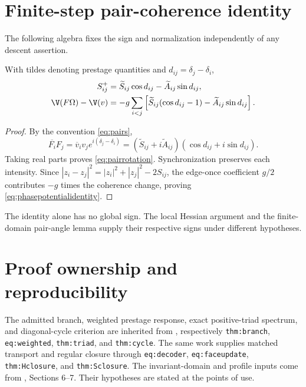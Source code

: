 \section{Finite-step pair-coherence identity}\label{app:pairidentity}

The following algebra fixes the sign and normalization independently of any descent assertion.

\begin{lemma}\label{lem:pairidentity}
With tildes denoting prestage quantities and \(d_{ij}=\delta_j-\delta_i\),
\begin{align}
S_{ij}^+&=\widetilde S_{ij}\cos d_{ij}
-\widetilde A_{ij}\sin d_{ij},\label{eq:pairrotation}\\
\V(F\Omega)-\V(v)
&=-g\sum_{i<j}\left[
\widetilde S_{ij}(\cos d_{ij}-1)
-\widetilde A_{ij}\sin d_{ij}\right].
\label{eq:phasepotentialidentity}
\end{align}
\end{lemma}
\begin{proof}
By the convention \eqref{eq:pairs},
\[
\overline{F_i}F_j
=\overline v_i v_j e^{i(\delta_j-\delta_i)}
=(\widetilde S_{ij}+i\widetilde A_{ij})
(\cos d_{ij}+i\sin d_{ij}).
\]
Taking real parts proves \eqref{eq:pairrotation}. Synchronization preserves each intensity. Since \(|z_i-z_j|^2=|z_i|^2+|z_j|^2-2S_{ij}\), the edge-once coefficient \(g/2\) contributes \(-g\) times the coherence change, proving \eqref{eq:phasepotentialidentity}.
\end{proof}

The identity alone has no global sign. The local Hessian argument and the finite-domain pair-angle lemma supply their respective signs under different hypotheses.

\section{Proof ownership and reproducibility}\label{app:ownership}

The admitted branch, weighted prestage response, exact positive-triad spectrum, and diagonal-cycle criterion are inherited from \cite{nrg}, respectively \texttt{thm:branch}, \texttt{eq:weighted}, \texttt{thm:triad}, and \texttt{thm:cycle}. The same work supplies matched transport and regular closure through \texttt{eq:decoder}, \texttt{eq:faceupdate}, \texttt{thm:Hclosure}, and \texttt{thm:Sclosure}. The invariant-domain and profile inputs come from \cite{relaxation}, Sections 6--7. Their hypotheses are stated at the points of use.

